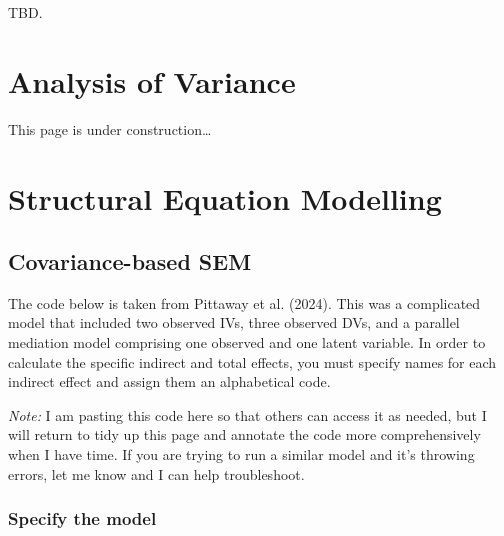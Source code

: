 \documentclass[
  letterpaper,
  DIV=11,
  numbers=noendperiod]{scrreprt}
\begin{document}
TBD.

\chapter{Analysis of Variance}\label{analysis-of-variance}

This page is under construction\ldots{} 🚧

\chapter{Structural Equation
Modelling}\label{structural-equation-modelling}

\section{Covariance-based SEM}\label{covariance-based-sem}

The code below is taken from Pittaway et al. (2024). This was a
complicated model that included two observed IVs, three observed DVs,
and a parallel mediation model comprising one observed and one latent
variable. In order to calculate the specific indirect and total effects,
you must specify names for each indirect effect and assign them an
alphabetical code.

\emph{Note:} I am pasting this code here so that others can access it as
needed, but I will return to tidy up this page and annotate the code
more comprehensively when I have time. If you are trying to run a
similar model and it's throwing errors, let me know and I can help
troubleshoot.

\subsection{Specify the model}\label{specify-the-model}
\end{document}
